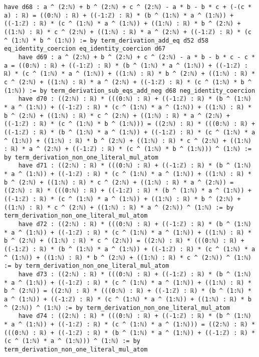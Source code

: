 \documentclass{article}
\begin{document}
\begin{tcolorbox}[colback=white!10, width=\linewidth]
\begin{lstlisting}[language=Lean4]
    have d68 : a ^ (2:ℕ) + b ^ (2:ℕ) + c ^ (2:ℕ) - a * b - b * c + (-(c * a) : ℝ) = ((0:ℕ) : ℝ) + ((-1:ℤ) : ℝ) * (b ^ (1:ℕ) * a ^ (1:ℕ)) + ((-1:ℤ) : ℝ) * (c ^ (1:ℕ) * a ^ (1:ℕ)) + ((1:ℕ) : ℝ) * b ^ (2:ℕ) + ((1:ℕ) : ℝ) * c ^ (2:ℕ) + ((1:ℕ) : ℝ) * a ^ (2:ℕ) + ((-1:ℤ) : ℝ) * (c ^ (1:ℕ) * b ^ (1:ℕ)) := by term_derivation_add_eq d52 d58 eq_identity_coercion eq_identity_coercion d67
    have d69 : a ^ (2:ℕ) + b ^ (2:ℕ) + c ^ (2:ℕ) - a * b - b * c - c * a = ((0:ℕ) : ℝ) + ((-1:ℤ) : ℝ) * (b ^ (1:ℕ) * a ^ (1:ℕ)) + ((-1:ℤ) : ℝ) * (c ^ (1:ℕ) * a ^ (1:ℕ)) + ((1:ℕ) : ℝ) * b ^ (2:ℕ) + ((1:ℕ) : ℝ) * c ^ (2:ℕ) + ((1:ℕ) : ℝ) * a ^ (2:ℕ) + ((-1:ℤ) : ℝ) * (c ^ (1:ℕ) * b ^ (1:ℕ)) := by term_derivation_sub_eqs_add_neg d68 neg_identity_coercion
    have d70 : ((2:ℕ) : ℝ) * (((0:ℕ) : ℝ) + ((-1:ℤ) : ℝ) * (b ^ (1:ℕ) * a ^ (1:ℕ)) + ((-1:ℤ) : ℝ) * (c ^ (1:ℕ) * a ^ (1:ℕ)) + ((1:ℕ) : ℝ) * b ^ (2:ℕ) + ((1:ℕ) : ℝ) * c ^ (2:ℕ) + ((1:ℕ) : ℝ) * a ^ (2:ℕ) + ((-1:ℤ) : ℝ) * (c ^ (1:ℕ) * b ^ (1:ℕ))) = ((2:ℕ) : ℝ) * (((0:ℕ) : ℝ) + ((-1:ℤ) : ℝ) * (b ^ (1:ℕ) * a ^ (1:ℕ)) + ((-1:ℤ) : ℝ) * (c ^ (1:ℕ) * a ^ (1:ℕ)) + ((1:ℕ) : ℝ) * b ^ (2:ℕ) + ((1:ℕ) : ℝ) * c ^ (2:ℕ) + ((1:ℕ) : ℝ) * a ^ (2:ℕ) + ((-1:ℤ) : ℝ) * (c ^ (1:ℕ) * b ^ (1:ℕ))) ^ (1:ℕ) := by term_derivation_non_one_literal_mul_atom
    have d71 : ((2:ℕ) : ℝ) * (((0:ℕ) : ℝ) + ((-1:ℤ) : ℝ) * (b ^ (1:ℕ) * a ^ (1:ℕ)) + ((-1:ℤ) : ℝ) * (c ^ (1:ℕ) * a ^ (1:ℕ)) + ((1:ℕ) : ℝ) * b ^ (2:ℕ) + ((1:ℕ) : ℝ) * c ^ (2:ℕ) + ((1:ℕ) : ℝ) * a ^ (2:ℕ)) = ((2:ℕ) : ℝ) * (((0:ℕ) : ℝ) + ((-1:ℤ) : ℝ) * (b ^ (1:ℕ) * a ^ (1:ℕ)) + ((-1:ℤ) : ℝ) * (c ^ (1:ℕ) * a ^ (1:ℕ)) + ((1:ℕ) : ℝ) * b ^ (2:ℕ) + ((1:ℕ) : ℝ) * c ^ (2:ℕ) + ((1:ℕ) : ℝ) * a ^ (2:ℕ)) ^ (1:ℕ) := by term_derivation_non_one_literal_mul_atom
    have d72 : ((2:ℕ) : ℝ) * (((0:ℕ) : ℝ) + ((-1:ℤ) : ℝ) * (b ^ (1:ℕ) * a ^ (1:ℕ)) + ((-1:ℤ) : ℝ) * (c ^ (1:ℕ) * a ^ (1:ℕ)) + ((1:ℕ) : ℝ) * b ^ (2:ℕ) + ((1:ℕ) : ℝ) * c ^ (2:ℕ)) = ((2:ℕ) : ℝ) * (((0:ℕ) : ℝ) + ((-1:ℤ) : ℝ) * (b ^ (1:ℕ) * a ^ (1:ℕ)) + ((-1:ℤ) : ℝ) * (c ^ (1:ℕ) * a ^ (1:ℕ)) + ((1:ℕ) : ℝ) * b ^ (2:ℕ) + ((1:ℕ) : ℝ) * c ^ (2:ℕ)) ^ (1:ℕ) := by term_derivation_non_one_literal_mul_atom
    have d73 : ((2:ℕ) : ℝ) * (((0:ℕ) : ℝ) + ((-1:ℤ) : ℝ) * (b ^ (1:ℕ) * a ^ (1:ℕ)) + ((-1:ℤ) : ℝ) * (c ^ (1:ℕ) * a ^ (1:ℕ)) + ((1:ℕ) : ℝ) * b ^ (2:ℕ)) = ((2:ℕ) : ℝ) * (((0:ℕ) : ℝ) + ((-1:ℤ) : ℝ) * (b ^ (1:ℕ) * a ^ (1:ℕ)) + ((-1:ℤ) : ℝ) * (c ^ (1:ℕ) * a ^ (1:ℕ)) + ((1:ℕ) : ℝ) * b ^ (2:ℕ)) ^ (1:ℕ) := by term_derivation_non_one_literal_mul_atom
    have d74 : ((2:ℕ) : ℝ) * (((0:ℕ) : ℝ) + ((-1:ℤ) : ℝ) * (b ^ (1:ℕ) * a ^ (1:ℕ)) + ((-1:ℤ) : ℝ) * (c ^ (1:ℕ) * a ^ (1:ℕ))) = ((2:ℕ) : ℝ) * (((0:ℕ) : ℝ) + ((-1:ℤ) : ℝ) * (b ^ (1:ℕ) * a ^ (1:ℕ)) + ((-1:ℤ) : ℝ) * (c ^ (1:ℕ) * a ^ (1:ℕ))) ^ (1:ℕ) := by term_derivation_non_one_literal_mul_atom

\end{lstlisting}
\end{tcolorbox}
\end{document}
